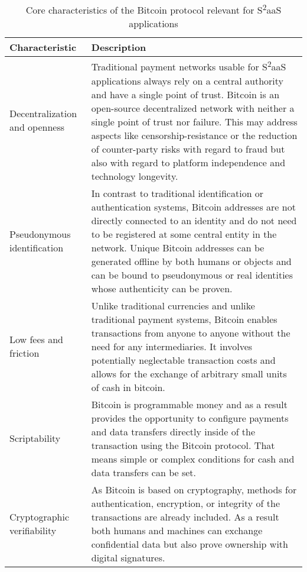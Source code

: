 \begin{table*}[t]
\centering
\caption{Core characteristics of the Bitcoin protocol relevant for S\textsuperscript{2}aaS applications}
\begin{tabular}{l p{12cm}}
Characteristic & Description \\
\hline
\hline
Decentralization and openness & Traditional payment networks usable for S\textsuperscript{2}aaS applications always rely on a central authority and have a single point of trust. Bitcoin is an open-source decentralized network with neither a single point of trust nor failure. This may address aspects like censorship-resistance or the reduction of counter-party risks with regard to fraud but also with regard to platform independence and technology longevity.\\
\hline
Pseudonymous identification & In contrast to traditional identification or authentication systems, Bitcoin addresses are not directly connected to an identity and do not need to be registered at some central entity in the network. Unique Bitcoin addresses can be generated offline by both humans or objects and can be bound to pseudonymous or real identities whose authenticity can be proven.\\
\hline
Low fees and friction & Unlike traditional currencies and unlike traditional payment systems, Bitcoin enables transactions from anyone to anyone without the need for any intermediaries. It involves potentially neglectable transaction costs and allows for the exchange of arbitrary small units of cash in bitcoin.\\
\hline
Scriptability & Bitcoin is programmable money and as a result provides the opportunity to configure payments and data transfers directly inside of the transaction using the Bitcoin protocol. That means simple or complex conditions for cash and data transfers can be set.\\
\hline
Cryptographic verifiability & As Bitcoin is based on cryptography, methods for authentication, encryption, or integrity of the transactions are already included. As a result both humans and machines can exchange confidential data but also prove ownership with digital signatures.\\
\hline
\end{tabular}
\label{table:characteristics}
\end{table*}

